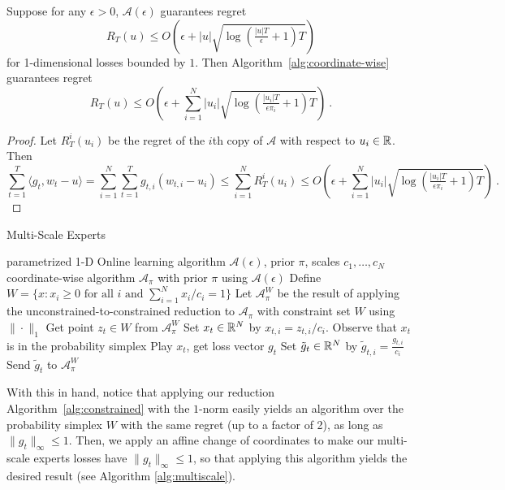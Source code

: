 \documentclass[12pt]{colt2018} %
\newcommand{\ol}{\mathcal{A}}
\begin{document}
\begin{theorem}\label{thm:coordinatewise}
Suppose for any $\epsilon>0$, $\ol(\epsilon)$ guarantees regret
\[
R_T(u)\le O\left(\epsilon + |u|\sqrt{\log\left(\tfrac{|u|T}{\epsilon}+1\right)T}\right)
\]
for 1-dimensional losses bounded by $1$. Then Algorithm~\ref{alg:coordinate-wise} guarantees regret
\[
R_T(u) \le O\left(\epsilon + \sum_{i=1}^N |u_i|\sqrt{\log\left(\tfrac{|u_i|T}{\epsilon\pi_i}+1\right)T}\right)~.
\]
\end{theorem}
%
\begin{proof}
Let $R^i_T(u_i)$ be the regret of the $i$th copy of $\ol$ with respect to $u_i\in \mathbb{R}$. Then
\[
\sum_{t=1}^T \langle g_t, w_t-u\rangle
=\sum_{i=1}^N\sum_{t=1}^T g_{t,i}(w_{t,i}-u_i)
\le \sum_{i=1}^N R^i_T(u_i)\le O\left(\epsilon + \sum_{i=1}^N |u_i|\sqrt{\log\left(\tfrac{|u_i|T}{\epsilon\pi_i}+1\right)T}\right)~.
\]
\end{proof}


\begin{algorithm}[h!]
   \caption{Multi-Scale Experts}
   \label{alg:multiscale}
\begin{algorithmic}[1]
   \REQUIRE parametrized 1-D Online learning algorithm $\ol(\epsilon)$, prior $\pi$, scales $c_1,\dots,c_N$
    coordinate-wise algorithm $\ol_\pi$ with prior $\pi$ using $\ol(\epsilon)$
   \STATE Define $W=\{x:x_i\ge 0\text{ for all }i\text{ and }\sum_{i=1}^N x_i/c_i=1\}$
   \STATE Let $\ol^W_\pi$ be the result of applying the unconstrained-to-constrained reduction to $\ol_\pi$ with constraint set $W$ using $\|\cdot\|_1$
   \STATE Get point $z_t\in W$ from $\ol^W_\pi$
   \STATE Set $x_t\in \mathbb{R}^N$ by $x_{t,i}=z_{t,i}/c_i$. Observe that $x_t$ is in the probability simplex
   \STATE Play $x_t$, get loss vector $g_t$
   \STATE Set $\tilde g_t\in \mathbb{R}^N$ by $\tilde g_{t,i} = \tfrac{g_{t,i}}{c_i}$
   \STATE Send $\tilde g_t$ to $\ol^W_\pi$
   \ENDFOR
\end{algorithmic}
\end{algorithm}

With this in hand, notice that applying our reduction Algorithm~\ref{alg:constrained} with the $1$-norm easily yields an algorithm over the probability simplex $W$ with the same regret (up to a factor of 2), as long as $\|g_t\|_\infty\le 1$. Then, we apply an affine change of coordinates to make our multi-scale experts losses have $\|g_t\|_\infty\le 1$, so that applying this algorithm yields the desired result (see Algorithm \ref{alg:multiscale}).
\end{document}
